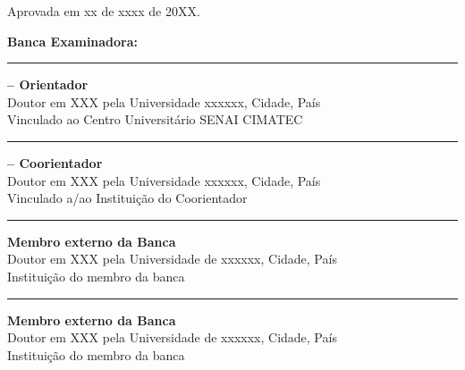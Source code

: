 \begin{folhadeaprovacao}

  \begin{center}
    {\ABNTEXchapterfont\Large\imprimirautor}

    \begin{center}
      \ABNTEXchapterfont\Large\imprimirtitulo
    \end{center}
   \end{center}
   
        
   \begin{flushright}
    Aprovada em xx de xxxx de 20XX. \\
   \end{flushright}
   
   
   \begin{flushleft}
   \textbf{Banca Examinadora: }
   \end{flushleft}
   \hfill \break
   \hrule
   \begin{flushleft}
    \textbf{\imprimirorientador\hspace{1mm}-- Orientador} \\
    Doutor em XXX pela Universidade xxxxxx, Cidade, País \\
    Vinculado ao Centro Universitário SENAI CIMATEC
   \end{flushleft}
   
   \hfill \break
   \hrule
   \begin{flushleft}
    \textbf{\imprimircoorientador\hspace{1mm}-- Coorientador} \\
    Doutor em XXX pela Universidade xxxxxx, Cidade, País \\
    Vinculado a/ao Instituição do Coorientador
   \end{flushleft}
   
   \hfill \break
   \hrule
   \begin{flushleft}
    \textbf{Membro externo da Banca} \\
    Doutor em XXX pela Universidade de xxxxxx, Cidade, País \\
    Instituição do membro da banca
   \end{flushleft}
   
   \hfill \break
   \hrule 
   
    \begin{flushleft}
    \textbf{Membro externo da Banca}  \\
    Doutor em XXX pela Universidade de xxxxxx, Cidade, País \\
    Instituição do membro da banca
   \end{flushleft}
   
\end{folhadeaprovacao}